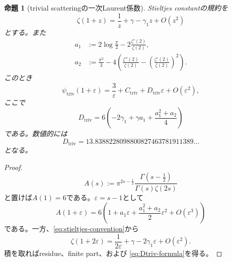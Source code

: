 \documentclass[11pt,a4paper]{ltjsarticle}
\newtheorem{proposition}[theorem]{命題}
\theoremstyle{definition}
\theoremstyle{remark}
\newcommand{\eps}{\varepsilon}
\begin{document}
\begin{proposition}[trivial scatteringの一次Laurent係数]
\label{prop:Dtriv-coefficient}
Stieltjes constantの規約を
\begin{equation}\label{eq:stieltjes-convention}
 \zeta(1+z)=\frac1z+\gamma-\gamma_1z+O(z^2)
\end{equation}
とする。また
\begin{align}
 a_1&:=2\log\frac\pi2
      -2\frac{\zeta'(2)}{\zeta(2)},
 \label{eq:a1-triv}\\
 a_2&:=\frac{\pi^2}{3}
 -4\left(
 \frac{\zeta''(2)}{\zeta(2)}
 -\left(\frac{\zeta'(2)}{\zeta(2)}\right)^2
 \right).
 \label{eq:a2-triv}
\end{align}
このとき
\begin{equation}\label{eq:triv-laurent-second}
 \psi_{\mathrm{triv}}(1+\eps)
 =\frac3\eps+C_{\mathrm{triv}}
 +D_{\mathrm{triv}}\eps+O(\eps^2),
\end{equation}
ここで
\begin{equation}\label{eq:Dtriv-formula}
 \boxed{
 D_{\mathrm{triv}}
 =6\left(
 -2\gamma_1+\gamma a_1
 +\frac{a_1^2+a_2}{4}
 \right)
 }
\end{equation}
である。数値的には
\begin{equation}\label{eq:Dtriv-numeric}
 \boxed{
 D_{\mathrm{triv}}
 =13.8388228098800827463781911389\ldots
 }
\end{equation}
となる。
\end{proposition}

\begin{proof}
\[
 A(s):=\pi^{2s-\frac12}
 \frac{\Gamma(s-\frac12)}{\Gamma(s)\zeta(2s)}
\]
と置けば$A(1)=6$である。$\eps=s-1$として
\[
 A(1+\eps)
 =6\left(
 1+a_1\eps+\frac{a_1^2+a_2}{2}\eps^2
 +O(\eps^3)
 \right)
\]
である。一方、\eqref{eq:stieltjes-convention}から
\[
 \zeta(1+2\eps)
 =\frac1{2\eps}+\gamma-2\gamma_1\eps+O(\eps^2).
\]
積を取ればresidue、finite part、および
\eqref{eq:Dtriv-formula}を得る。
\end{proof}
\end{document}
